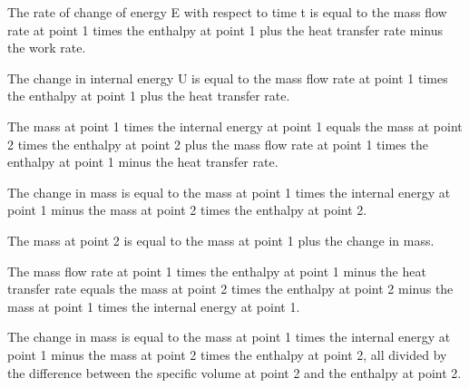 The rate of change of energy E with respect to time t is equal to the mass flow rate at point 1 times the enthalpy at point 1 plus the heat transfer rate minus the work rate.

The change in internal energy U is equal to the mass flow rate at point 1 times the enthalpy at point 1 plus the heat transfer rate.

The mass at point 1 times the internal energy at point 1 equals the mass at point 2 times the enthalpy at point 2 plus the mass flow rate at point 1 times the enthalpy at point 1 minus the heat transfer rate.

The change in mass is equal to the mass at point 1 times the internal energy at point 1 minus the mass at point 2 times the enthalpy at point 2.

The mass at point 2 is equal to the mass at point 1 plus the change in mass.

The mass flow rate at point 1 times the enthalpy at point 1 minus the heat transfer rate equals the mass at point 2 times the enthalpy at point 2 minus the mass at point 1 times the internal energy at point 1.

The change in mass is equal to the mass at point 1 times the internal energy at point 1 minus the mass at point 2 times the enthalpy at point 2, all divided by the difference between the specific volume at point 2 and the enthalpy at point 2.